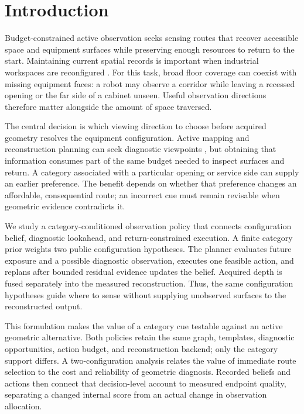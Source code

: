 \documentclass[11pt,a4paper]{article}
\providecommand{\hypertarget}[2]{#2}
\begin{document}
\hypertarget{introduction}{%
\section{Introduction}\label{introduction}}

Budget-constrained active observation seeks sensing routes that recover accessible space and equipment surfaces while preserving enough resources to return to the start. Maintaining current spatial records is important when industrial workspaces are reconfigured \cite{ref9}. For this task, broad floor coverage can coexist with missing equipment faces: a robot may observe a corridor while leaving a recessed opening or the far side of a cabinet unseen. Useful observation directions therefore matter alongside the amount of space traversed.

The central decision is which viewing direction to choose before acquired geometry resolves the equipment configuration. Active mapping and reconstruction planning can seek diagnostic viewpoints \cite{ref10}, but obtaining that information consumes part of the same budget needed to inspect surfaces and return. A category associated with a particular opening or service side can supply an earlier preference. The benefit depends on whether that preference changes an affordable, consequential route; an incorrect cue must remain revisable when geometric evidence contradicts it.

We study a category-conditioned observation policy that connects configuration belief, diagnostic lookahead, and return-constrained execution. A finite category prior weights two public configuration hypotheses. The planner evaluates future exposure and a possible diagnostic observation, executes one feasible action, and replans after bounded residual evidence updates the belief. Acquired depth is fused separately into the measured reconstruction. Thus, the same configuration hypotheses guide where to sense without supplying unobserved surfaces to the reconstructed output.

This formulation makes the value of a category cue testable against an active geometric alternative. Both policies retain the same graph, templates, diagnostic opportunities, action budget, and reconstruction backend; only the category support differs. A two-configuration analysis relates the value of immediate route selection to the cost and reliability of geometric diagnosis. Recorded beliefs and actions then connect that decision-level account to measured endpoint quality, separating a changed internal score from an actual change in observation allocation.
\end{document}
